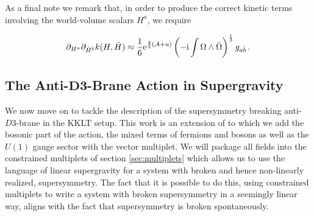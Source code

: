\documentclass[a4paper,12pt,twoside,openright]{report}
\newcommand{\be}{\begin{equation}}
\newcommand{\ee}{\end{equation}}
\def\rmi{{\rm i}}
\def\rme{{\rm e}}
\begin{document}
As a final note we remark that, in order to produce the correct kinetic terms involving the world-volume scalars $H^a$, we require

\be
\partial_{H^a}\partial_{\bar{H}^{\bar{b}}} k(H,\bar{H}) \approx \frac{1}{6} \rme^{\frac{4}{3} (\mathcal{A} + u )} \left(-\rmi \int \Omega \wedge \bar{\Omega} \right)^{\frac{1}{3}} g_{a\bar{b}}\,.
\ee

\subsection[The Anti-$D3$-Brane Action in Supergravity]{The Anti-$\mathbf{D3}$-Brane Action in Supergravity}
\label{sec:sugraact}
We now move on to tackle the description of the supersymmetry breaking anti-$D3$-brane in the KKLT setup. This work is an extension of \cite{GarciadelMoral:2017vnz} to which we add the bosonic part of the action, the mixed terms of fermions and bosons as well as the $U(1)$ gauge sector with the vector multiplet. We will package all fields into the constrained multiplets of section \ref{sec:multiplets} which allows us to use the language of linear supergravity for a system with broken and hence non-linearly realized, supersymmetry. The fact that it is possible to do this, using constrained multiplets to write a system with broken supersymmetry in a seemingly linear way, aligns with the fact that supersymmetry is broken spontaneously.
\end{document}
